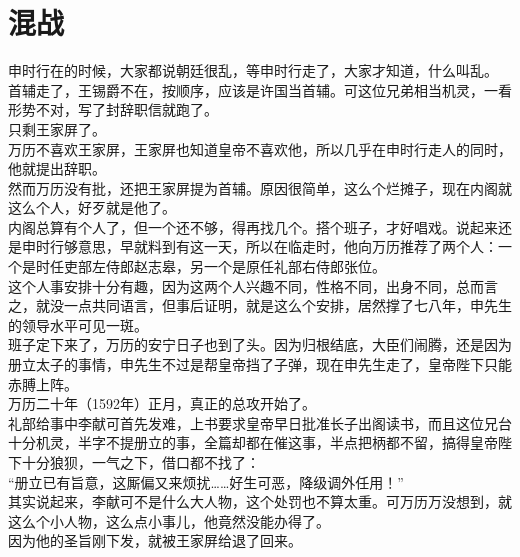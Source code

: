\section{混战}
\ifnum{}
	\begin{multicols}{\theparacolNo}
\fi
申时行在的时候，大家都说朝廷很乱，等申时行走了，大家才知道，什么叫乱。\\

首辅走了，王锡爵不在，按顺序，应该是许国当首辅。可这位兄弟相当机灵，一看形势不对，写了封辞职信就跑了。\\

只剩王家屏了。\\

万历不喜欢王家屏，王家屏也知道皇帝不喜欢他，所以几乎在申时行走人的同时，他就提出辞职。\\

然而万历没有批，还把王家屏提为首辅。原因很简单，这么个烂摊子，现在内阁就这么个人，好歹就是他了。\\

内阁总算有个人了，但一个还不够，得再找几个。搭个班子，才好唱戏。说起来还是申时行够意思，早就料到有这一天，所以在临走时，他向万历推荐了两个人：一个是时任吏部左侍郎赵志皋，另一个是原任礼部右侍郎张位。\\

这个人事安排十分有趣，因为这两个人兴趣不同，性格不同，出身不同，总而言之，就没一点共同语言，但事后证明，就是这么个安排，居然撑了七八年，申先生的领导水平可见一斑。\\

班子定下来了，万历的安宁日子也到了头。因为归根结底，大臣们闹腾，还是因为册立太子的事情，申先生不过是帮皇帝挡了子弹，现在申先生走了，皇帝陛下只能赤膊上阵。\\

万历二十年（1592年）正月，真正的总攻开始了。\\

礼部给事中李献可首先发难，上书要求皇帝早日批准长子出阁读书，而且这位兄台十分机灵，半字不提册立的事，全篇却都在催这事，半点把柄都不留，搞得皇帝陛下十分狼狈，一气之下，借口都不找了：\\

“册立已有旨意，这厮偏又来烦扰……好生可恶，降级调外任用！”\\

其实说起来，李献可不是什么大人物，这个处罚也不算太重。可万历万没想到，就这么个小人物，这么点小事儿，他竟然没能办得了。\\

因为他的圣旨刚下发，就被王家屏给退了回来。\\


\end{multicols}
